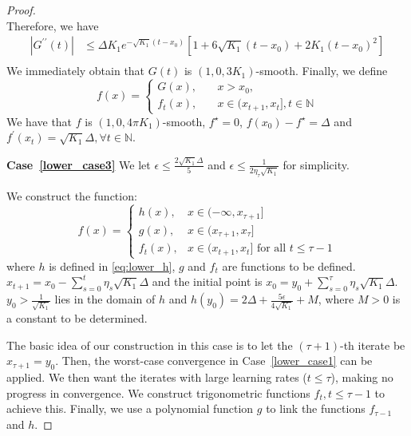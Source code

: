 \documentclass{article}
\begin{document}
\begin{proof}
$$$$
Therefore, we have 
\begin{align*}
    |G^{\prime \prime}(t)|&\leq \Delta K_1 e^{-\sqrt{K_1}\left(t-x_0\right)}\left[1+6 \sqrt{K_1}\left(t-x_0\right)+2 K_1\left(t-x_0\right)^2\right]\\
\end{align*}
We immediately obtain that $G(t)$ is $(1,0,3K_1)$-smooth. Finally, we define 
$$
f(x)=\begin{cases}
    G(x), \quad &x>x_0,\\
    f_t(x), \quad & x\in(x_{t+1},x_t],t\in\mathbb{N}
\end{cases}$$
We have that $f$ is $(1,0,4\pi K_1)$-smooth, $f^\star=0$, $f(x_0)-f^\star=\Delta$ and $f^{\prime}(x_t)=\sqrt{K_1}\Delta,\forall t\in\mathbb{N}$.

\textbf{Case~\ref{lower_case3}}
We let $\epsilon\leq \frac{2\sqrt{K_1}\Delta}{5}$ and $\epsilon\leq\frac{1}{2\eta_\tau\sqrt{K_1}}$ for simplicity.

We construct the function:
\begin{equation}\label{eq:lower_overall_function}
    f(x) = \left\{ \begin{array}{cc}
          h(x) ,  & x \in (-\infty, x_{\tau+1}] \\
          g(x) ,  & x \in ( x_{\tau+1}, x_\tau] \\
          f_t(x) , & x \in ( x_{t+1}, x_t ] \text{ for all } t \le \tau - 1
        \end{array} \right.
\end{equation}
where $h$ is defined in \eqref{eq:lower_h}, $g$ and $f_t$ are functions to be defined.
$x_{t+1} = x_0 - \sum_{s=0}^t \eta_s \sqrt{K_1} \Delta$ and the initial point is $x_0 = y_0 + \sum_{s=0}^{\tau} \eta_s \sqrt{K_1} \Delta$. $y_0>\frac{1}{\sqrt{K_1}}$ lies in the domain of $h$ and $h(y_0)=2\Delta+\frac{5\epsilon}{4\sqrt{K_1}}+M$, where $M>0$ is a constant to be determined.

The basic idea of our construction in this case is to let the $(\tau+1)$-th iterate be 
$x_{\tau+1}=y_0$.
Then, the worst-case convergence in Case~\ref{lower_case1} can be applied. 
We then want the iterates with large learning rates ($t\leq\tau$), making no progress in convergence. We construct trigonometric functions $f_t,t\leq\tau-1$ to achieve this.
Finally, we use a polynomial function $g$ to link the functions $f_{\tau-1}$ and $h$. 


\end{proof}
\end{document}
